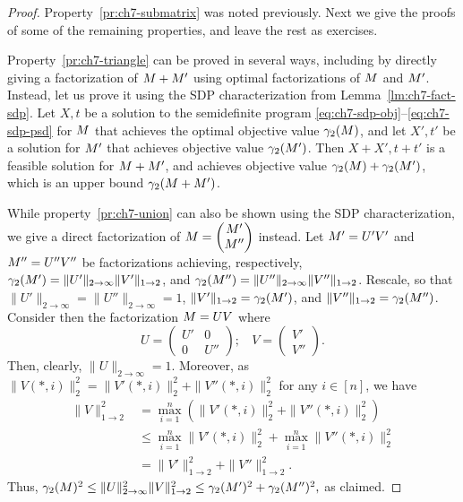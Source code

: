 \begin{proof}
  Property~\ref{pr:ch7-submatrix} was noted previously. Next we
  give the proofs of some of the remaining properties, and leave
  the rest as exercises.

  Property~\ref{pr:ch7-triangle} can be proved in several ways,
  including by directly giving a factorization of $M + M'$ using
  optimal factorizations of $M$ and $M'$. Instead, let us prove
  it using the SDP characterization from
  Lemma~\ref{lm:ch7-fact-sdp}. Let $X, t$ be a solution to the
  semidefinite program \eqref{eq:ch7-sdp-obj}--\eqref{eq:ch7-sdp-psd}
  for $M$ that achieves the optimal objective value
  $\gamma_2(M)$, and let $X', t'$ be a solution for $M'$ that
  achieves objective value $\gamma_2(M')$. Then $X + X', t + t'$ is a
  feasible solution for $M + M'$, and achieves objective value
  $\gamma_2(M) + \gamma_2(M')$, which is an upper bound $\gamma_2(M + M')$.

\smallskip
  While property~\ref{pr:ch7-union} can also be shown using the SDP
  characterization, we give a direct
  factorization of $M = \begin{pmatrix}M'\\ M''\end{pmatrix}$
  instead. Let $M' = U' V'$ and $M'' = U'' V''$ be
  factorizations achieving, respectively,
  $\gamma_2(M') = \|U'\|_{2\to\infty} \|V'\|_{1\to 2}$, and
  $\gamma_2(M'') = \|U''\|_{2\to\infty} \|V''\|_{1\to
    2}$. 
    Rescale, so that
  $\|U'\|_{2\to\infty} = \|U''\|_{2\to\infty} = 1$,
  $\|V'\|_{1\to 2} = \gamma_2(M')$, and
  $\|V''\|_{1\to 2} = \gamma_2(M'')$.
  Consider then the factorization $M = UV$ where
  \[
    U =
    \begin{pmatrix}
      U' &0\\
      0  &U''
    \end{pmatrix}; \ \ \ \ 
    V =
    \begin{pmatrix}
      V'\\
      V''
    \end{pmatrix}.
  \]
  Then, clearly,
  \(
  \|U\|_{2 \to \infty}= 1.
  \)
  Moreover, as
  \(\|V(*,i)\|_2^2 = \|V'(*,i)\|_2^2 + \|V''(*,i)\|_2^2\)
  for any $i \in [n]$, we have
  \begin{align*}
    \|V\|_{1\to 2}^2 &= \max_{i = 1}^n \left( \|V'(*,i)\|_2^2 + \|V''(*,i)\|_2^2 \right)\\
    &\le
      \max_{i = 1}^n  \|V'(*,i)\|_2^2 + \max_{i=1}^n\|V''(*,i)\|_2^2\\
    &=
    \|V'\|_{1\to 2}^2 + \|V''\|_{1\to 2}^2.
  \end{align*}
  Thus,
  \(
  \gamma_2(M)^2 \le \|U\|^2_{2\to\infty} \|V\|^2_{1\to 2}
  \le
  \gamma_2(M')^2 + \gamma_2(M'')^2,
  \)
  as claimed.
  

\end{proof}
